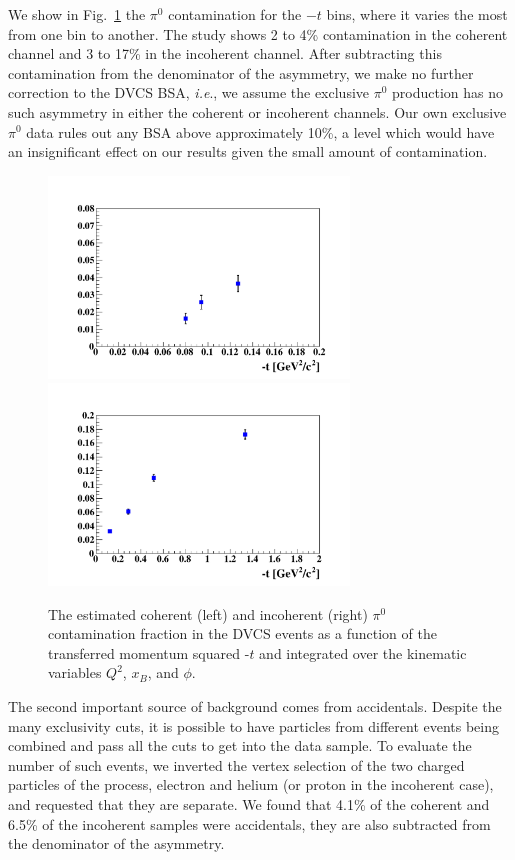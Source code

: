 \documentclass[aps,prc,preprint,superscriptaddress]{revtex4}
\begin{document}
We show in Fig.~\ref{fig:cont_yield} the $\pi^0$ contamination for the $-t$ 
bins, where it varies the most from one bin to another. The study shows 2 to 
4\% contamination in the coherent channel and 3 to 17\% in the incoherent 
channel. After subtracting this contamination from the denominator of the 
asymmetry, we make no further correction to 
the DVCS BSA, \textit{i.e}., we assume the exclusive $\pi^0$ production has no such 
asymmetry in either the coherent or incoherent channels. Our own exclusive $\pi^0$ 
data rules out any BSA above approximately 10\%, a level which would have an 
insignificant effect on our results given the small amount of contamination.

\begin{figure}[tbp]
\includegraphics[width=8cm]{T_ratio_pi0_dvcs_Coh_t.pdf}
\includegraphics[width=8cm]{T_ratio_pi0_dvcs_InCoh_t.pdf}
\caption{The estimated coherent (left) and incoherent (right) $\pi^{0}$ 
contamination fraction in the DVCS events as a function of the 
transferred momentum squared -$t$ and integrated over the kinematic 
variables $Q^2$, $x_B$, and $\phi$.}
\label{fig:cont_yield}
\end{figure}

The second important source of background comes from accidentals. Despite the many exclusivity cuts, it is 
possible to have particles from different events being combined and pass all the cuts to get 
into the data sample. To evaluate the number of such events, we inverted the vertex selection 
of the two charged 
particles of the process, electron and helium (or proton in the incoherent case), and requested that they
are separate. We found that 4.1\% of the coherent and 6.5\% of the incoherent samples were accidentals,
they are also subtracted from the denominator of the asymmetry. 
\end{document}
